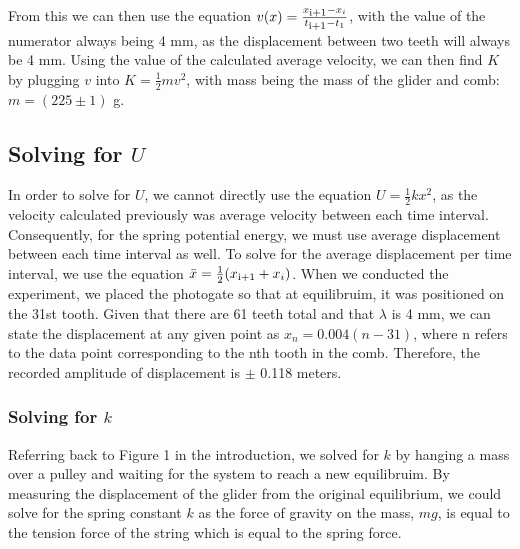 \documentclass[titlepage]{article}
\begin{document}
From this we can then use the equation $v(x) = \frac{x\textsubscript{i+1}-x_i}{t\textsubscript{i+1}-t_1}$, with the value of the numerator always being 4 mm, as the displacement between two teeth will always be 4 mm. Using the value of the calculated average velocity, we can then find $K$ by plugging $v$ into $K = \frac{1}{2}mv^2$, with mass being the mass of the glider and comb: $m = (225 \pm 1)$ g.

\subsection{Solving for $U$}
In order to solve for $U$, we cannot directly use the equation $U = \frac{1}{2}kx^2$, as the velocity calculated previously was average velocity between each time interval. Consequently, for the spring potential energy, we must use average displacement between each time interval as well. To solve for the average displacement per time interval, we use the equation $\bar x = \frac{1}{2}(x\textsubscript{i+1}+x_i)$. When we conducted the experiment, we placed the photogate so that at equilibruim, it was positioned on the 31st tooth. Given that there are 61 teeth total and that $\lambda$ is 4 mm, we can state the displacement at any given point as $x_n = 0.004(n - 31)$, where n refers to the data point corresponding to the nth tooth in the comb. Therefore, the recorded amplitude of displacement is $\pm$ 0.118 meters.

\subsubsection{Solving for $k$}
Referring back to Figure 1 in the introduction, we solved for $k$ by hanging a mass over a pulley and waiting for the system to reach a new equilibruim. By measuring the displacement of the glider from the original equilibrium, we could solve for the spring constant $k$ as the force of gravity on the mass, $mg$, is equal to the tension force of the string which is equal to the spring force.
\end{document}
